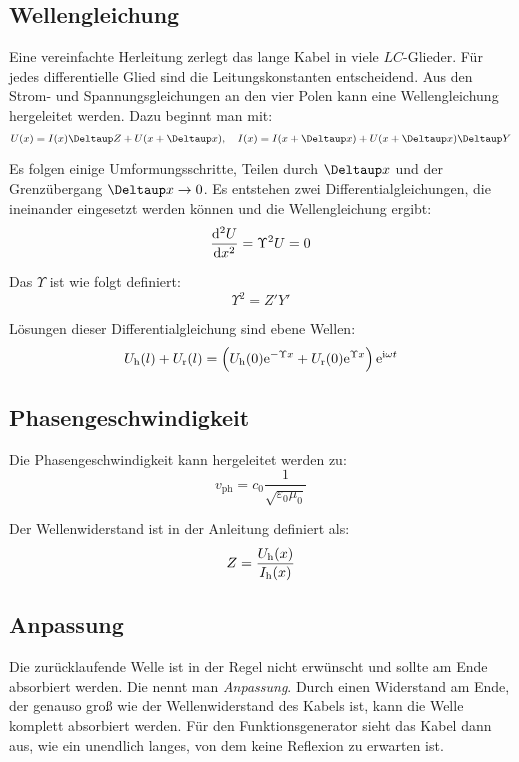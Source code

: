 \subsection{Wellengleichung}

Eine vereinfachte Herleitung zerlegt das lange Kabel in viele $LC$-Glieder. Für
jedes differentielle Glied sind die Leitungskonstanten entscheidend. Aus den
Strom- und Spannungsgleichungen an den vier Polen kann eine Wellengleichung
hergeleitet werden. Dazu beginnt man mit:
\[
	U(x) = I(x) \Deltaup Z + U(x + \Deltaup x)
	\eqnsep
	I(x) = I(x + \Deltaup x) + U(x + \Deltaup x) \Deltaup Y
\]

Es folgen einige Umformungsschritte, Teilen durch $\Deltaup x$ und der
Grenzübergang $\Deltaup x \to 0$. Es entstehen zwei Differentialgleichungen,
die ineinander eingesetzt werden können und die Wellengleichung ergibt:
\[
	\dod[2] Ux = \Upsilon^2 U = 0
\]

Das $\Upsilon$ ist wie folgt definiert:
\begin{equation}
	\label{eq:1.6}
	\Upsilon^2 = Z' Y'
\end{equation}

Lösungen dieser Differentialgleichung sind ebene Wellen:
\begin{equation}
	\label{eq:1.7}
	\Uh(l) + \Ur(l)
	= \del{\Uh(0) \eup^{-\Upsilon x} + \Ur(0) \eup^{\Upsilon x}} \eup^{\iup \omega t}
\end{equation}

\subsection{Phasengeschwindigkeit}

Die Phasengeschwindigkeit kann hergeleitet werden zu:
\begin{equation}
	\label{eq:1.13}
	v_\text{ph} = c_0 \frac{1}{\sqrt{\varepsilon_0 \mu_0}}
\end{equation}

Der Wellenwiderstand ist in der Anleitung definiert als:
\begin{equation}
	\label{eq:1.14}
	Z = \frac{U_\text h (x)}{I_\text h (x)}
\end{equation}

\subsection{Anpassung}

Die zurücklaufende Welle ist in der Regel nicht erwünscht und sollte am Ende
absorbiert werden. Die nennt man \emph{Anpassung}. Durch einen Widerstand am
Ende, der genauso groß wie der Wellenwiderstand des Kabels ist, kann die Welle
komplett absorbiert werden. Für den Funktionsgenerator sieht das Kabel dann
aus, wie ein unendlich langes, von dem keine Reflexion zu erwarten ist. 

